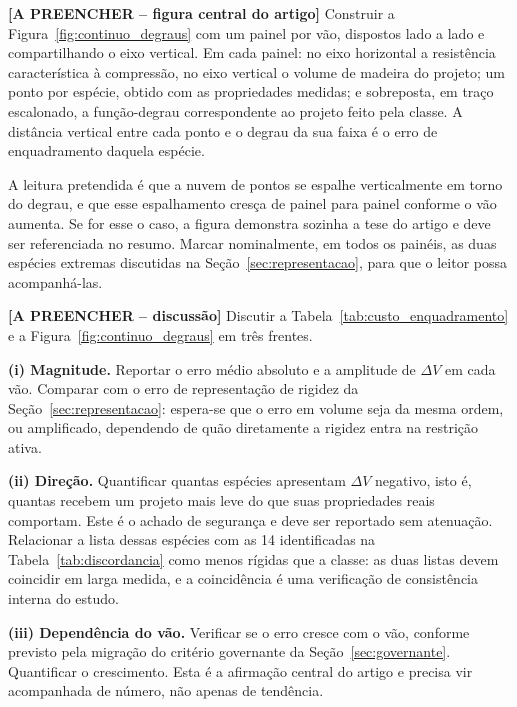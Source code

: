 \begin{fillblock}
\noindent\textbf{[A PREENCHER -- figura central do artigo]} Construir a Figura~\ref{fig:continuo_degraus} com um painel por vão, dispostos lado a lado e compartilhando o eixo vertical. Em cada painel: no eixo horizontal a resistência característica à compressão, no eixo vertical o volume de madeira do projeto; um ponto por espécie, obtido com as propriedades medidas; e sobreposta, em traço escalonado, a função-degrau correspondente ao projeto feito pela classe. A distância vertical entre cada ponto e o degrau da sua faixa é o erro de enquadramento daquela espécie.

A leitura pretendida é que a nuvem de pontos se espalhe verticalmente em torno do degrau, e que esse espalhamento cresça de painel para painel conforme o vão aumenta. Se for esse o caso, a figura demonstra sozinha a tese do artigo e deve ser referenciada no resumo. Marcar nominalmente, em todos os painéis, as duas espécies extremas discutidas na Seção~\ref{sec:representacao}, para que o leitor possa acompanhá-las.
\end{fillblock}

\begin{fillblock}
\noindent\textbf{[A PREENCHER -- discussão]} Discutir a Tabela~\ref{tab:custo_enquadramento} e a Figura~\ref{fig:continuo_degraus} em três frentes.

\textbf{(i) Magnitude.} Reportar o erro médio absoluto e a amplitude de $\Delta V$ em cada vão. Comparar com o erro de representação de rigidez da Seção~\ref{sec:representacao}: espera-se que o erro em volume seja da mesma ordem, ou amplificado, dependendo de quão diretamente a rigidez entra na restrição ativa.

\textbf{(ii) Direção.} Quantificar quantas espécies apresentam $\Delta V$ negativo, isto é, quantas recebem um projeto mais leve do que suas propriedades reais comportam. Este é o achado de segurança e deve ser reportado sem atenuação. Relacionar a lista dessas espécies com as 14 identificadas na Tabela~\ref{tab:discordancia} como menos rígidas que a classe: as duas listas devem coincidir em larga medida, e a coincidência é uma verificação de consistência interna do estudo.

\textbf{(iii) Dependência do vão.} Verificar se o erro cresce com o vão, conforme previsto pela migração do critério governante da Seção~\ref{sec:governante}. Quantificar o crescimento. Esta é a afirmação central do artigo e precisa vir acompanhada de número, não apenas de tendência.
\end{fillblock}


